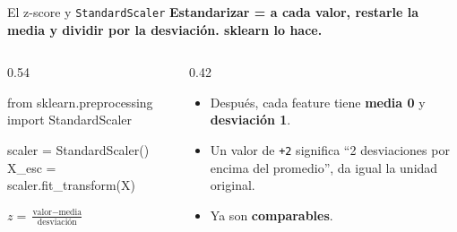 \documentclass[aspectratio=169, 11pt]{beamer}
\begin{document}
\begin{frame}[fragile,shrink=15]{El z-score y \texttt{StandardScaler}}
  \vspace{-4pt}
  {\small\color{arcaDark}\bfseries
    Estandarizar = a cada valor, restarle la media y dividir por la desviación. sklearn lo hace.}

  \vspace{4pt}
  \begin{columns}[T]
    \begin{column}{0.54\textwidth}
      \begin{pyblock}
from sklearn.preprocessing import StandardScaler

scaler = StandardScaler()
X_esc = scaler.fit_transform(X)
      \end{pyblock}
      \vspace{2pt}
      {\scriptsize\color{arcaDark}
        \(\displaystyle z = \frac{\text{valor} - \text{media}}{\text{desviación}}\)}
    \end{column}
    \begin{column}{0.42\textwidth}
      {\scriptsize\color{textMuted}
      \begin{itemize}\setlength{\itemsep}{5pt}
        \item[{\color{arcaRed}\scriptsize\faArrowRight}]
          Después, cada feature tiene \textbf{media 0} y
          \textbf{desviación 1}.
        \item[{\color{arcaRed}\scriptsize\faArrowRight}]
          Un valor de \texttt{+2} significa ``2 desviaciones
          por encima del promedio'', da igual la unidad
          original.
        \item[{\color{codeGreen}\scriptsize\faCheck}]
          Ya son \textbf{comparables}.
      \end{itemize}
      }
    \end{column}
  \end{columns}
\end{frame}
\end{document}
